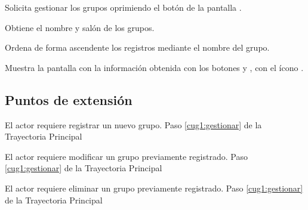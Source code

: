 \begin{UCtrayectoria}
	
	\UCpaso [\UCactor] Solicita gestionar los grupos oprimiendo el botón  de la pantalla .
	
	\UCpaso [\UCsist] Obtiene el nombre y salón de los grupos.
	
	\UCpaso [\UCsist] Ordena de forma ascendente los registros mediante el nombre del grupo.
	
	\UCpaso[\UCsist] Muestra la pantalla  con la información obtenida con los botones  y , con el ícono \btnRegistrar. \label{cug1:gestionar}
\end{UCtrayectoria}


\subsection{Puntos de extensión}

\UCExtensionPoint 
{El actor requiere registrar un nuevo grupo.}
{Paso \ref{cug1:gestionar} de la Trayectoria Principal}
{}

\UCExtensionPoint 
{El actor requiere modificar un grupo previamente registrado.}
{Paso \ref{cug1:gestionar} de la Trayectoria Principal}
{}

\UCExtensionPoint 
{El actor requiere eliminar un grupo previamente registrado.}
{Paso \ref{cug1:gestionar} de la Trayectoria Principal}
{}


